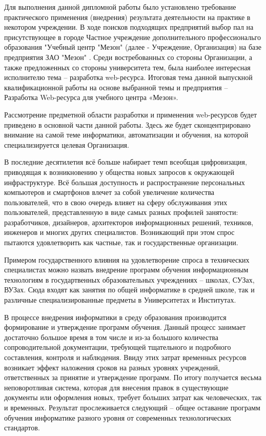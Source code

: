 

Для выполнения данной дипломной работы было установлено требование практического применения (внедрения) результата деятельности на практике в некотором учреждении. В ходе поисков подходящих предприятий выбор пал на присутствующее в городе Частное учреждение дополнительного профессиональго образования "Учебный центр "Мезон" \cite{meson-uc} (далее - Учреждение, Организация) на базе предприятия ЗАО "Мезон" \cite{meson}. Среди востребованных со стороны Организации, а также предложенных со стороны университета тем, была наиболее интересная исполнителю тема -- разработка web-ресурса. Итоговая тема данной выпускной квалификационной работы на основе выбранной темы и предприятия -- Разработка Web-ресурса для учебного центра «Мезон».

Рассмотрение предметной области разработки и применения web-ресурсов будет приведено в основной части данной работы. Здесь же будет сконцентрировано внимание на самой теме информатики, автоматизации и обучения, на которой специализируется целевая Организация.

В последние десятилетия всё больше набирает темп всеобщая цифровизация, приводящая к возникновению у общества новых запросов к окружающей инфраструктуре.
Всё большая доступность и распространение персональных компьютеров и смартфонов влечет за собой увеличение количества пользователей, что в свою очередь влияет на сферу обслуживания этих пользователей, представленную в виде самых разных профилей занятости: разработчиков, дизайнеров, архитекторов информационных решений, техников, инженеров и многих других специалистов.
Возникающий при этом спрос пытаются удовлетворить как частные, так и государственные организации.

Примером государственного влияния на удовлетворение спроса в технических специалистах можно назвать внедрение программ обучения информационным технологиям в государтвенных образовательных учреждениях -- школах, СУЗах, ВУЗах.
Сюда входят как занятия по общей информатике в средней школе, так и различные специализированные предметы в Университетах и Институтах.

В процессе внедрения информатики в среду образования производится формирование и утверждение программ обучения.
Данный процесс занимает достаточно большое время в том числе и из-за большого количества сопроводительной документации, требующей тщательного и подробного составления, контроля и наблюдения.
Ввиду этих затрат временных ресурсов возникает эффект наложения сроков на разных уровнях учреждений, ответственных за принятие и утверждение программ.
По итогу получается весьма неповоротливая система, которая для внесения правок в существующие документы или оформления новых, требует больших затрат как человеческих, так и временных.
Результат прослеживается следующий -- общее оставание программ обучения информатике разного уровня от современных технологических стандартов.

